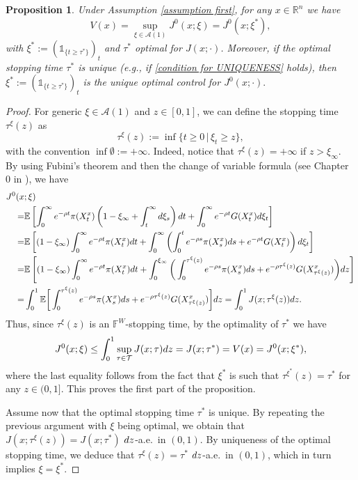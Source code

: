 \documentclass[11pt]{amsart}
\newtheorem{proposition}[theorem]{Proposition}
\theoremstyle{plain}
\def \dd{{\rm d}}
\def \R{\mathbb{R}}
\numberwithin{equation}{section}
\begin{document}
\begin{proposition}\label{prop xi does not explore}
Under Assumption \ref{assumption first}, for any $x \in \R^n$ we have 
$$
V(x) = \sup _{\xi \in \mathcal A (1) } J^0(x;\xi) = J^0 (x;\xi^*), 
$$
with $\xi^* := ( \mathds 1 _{ \{ t \geq \tau^* \} } )_t$ and $\tau^*$ optimal for $J(x;\cdot)$.    
Moreover, if the  optimal stopping time $\tau^*$ is unique (e.g., if \eqref{condition for UNIQUENESS} holds), then $\xi^* := (\mathds 1 _{ \{ t \geq \tau^* \} })_t$ is the unique optimal control for $J^0(x;\cdot).$
\end{proposition}
\begin{proof}
For generic $\xi \in \mathcal A (1)$ and $z \in [0,1]$, we can define the stopping time $\tau ^\xi (z)$ as
$$
\tau^\xi (z) := \inf \{ t \geq 0 \, | \, \xi_t \geq z \},
$$
with the convention $\inf \emptyset := + \infty$.
Indeed, notice that $\tau^\xi (z) = + \infty$ if $z > \xi_\infty$.
By using Fubini's theorem and then the change of variable formula (see Chapter 0 in \cite{revuz.yor.2013continuous}), we have
$$
\begin{aligned}
    J^0(x&;\xi) \\
    =& \mathbb{E}\left[\int_{0}^{\infty} e^{-\rho t} \pi (X^x_{t}) \left(1 -\xi_\infty + \int_t^\infty  \dd \xi_s  \right) \dd t + \int_{0}^{\infty} e ^{- \rho t} G(X^x_t )  \dd \xi_t  \right] \\
     =& \mathbb{E}\left[ (1 -\xi_\infty) \int_{0}^{\infty} e^{-\rho t} \pi (X^x_{t})   \dd t + \int_{0}^{\infty}  \left( \int_0^t e^{-\rho s} \pi (X^x_{s})   \dd s +  e ^{- \rho t} G(X^x_t ) \right)  \dd \xi_t  \right] \\
     =& \mathbb{E}\left[ (1 -\xi_\infty) \int_{0}^{\infty} e^{-\rho t} \pi (X^x_{t})   \dd t 
     +\int_{0}^{\xi_\infty} \bigg( \int_0^{\tau^\xi (z)} e^{-\rho s} \pi (X^x_{s})   \dd s +  e ^{- \rho {\tau^\xi (z)}} G(X^x_{\tau^\xi (z)} ) \bigg)   \dd z  \right] \\
     =& \int_{0}^1 \mathbb{E}\bigg[   \int_0^{\tau^\xi (z)} e^{-\rho s} \pi (X^x_{s})   \dd s +  e ^{- \rho {\tau^\xi (z)}} G(X^x_{\tau^\xi (z)} )   \bigg]   \dd z 
     =\int_{0}^1 J(x;\tau^\xi (z) )  \dd z.
\end{aligned}
$$
Thus, since  $\tau^\xi(z)$ is an $\mathbb F ^W$-stopping time, by the optimality of $\tau^*$ we have
$$
J^0(x; \xi) \leq \int_{0}^1 \sup_{\tau \in \mathcal T } J(x;\tau )   \dd z = J(x;\tau^*) = V(x) = J^0(x;\xi^*), 
$$
where the last equality follows from the fact that  $\xi^*$ is such that $\tau^{\xi^*}(z) = \tau^*$ for any $z \in (0,1]$. This proves the first part of the proposition.

Assume now that the optimal stopping time $\tau^*$ is unique.
By repeating the previous argument with $\xi$ being optimal, we obtain that $J(x;\tau^\xi (z)) = J(x;\tau^*)$ $ \dd z$-a.e.\ in $(0,1)$. 
By uniqueness of the optimal stopping time, we deduce that $\tau^\xi (z) = \tau^*$ $ \dd z$-a.e.\ in $(0,1)$, which in turn implies $\xi = \xi^*$.
\end{proof}
\end{document}
